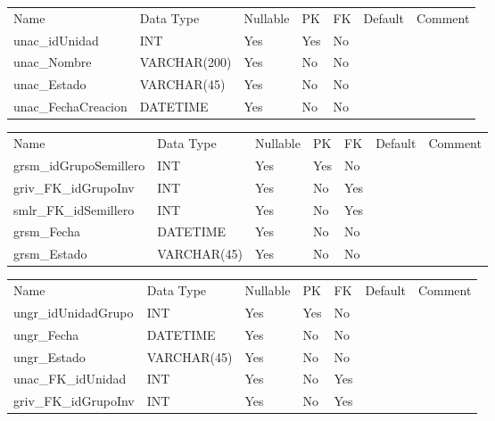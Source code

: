 			\begin{center}
				\begin{tabular}{ |l|l|l|l|l|l|l| }
					\hline
					Name & Data Type & Nullable & PK & FK & Default & Comment \\
					unac_idUnidad & INT & Yes & Yes & No &  & \\ \hline 
unac_Nombre & VARCHAR(200) & Yes & No & No &  & \\ \hline 
unac_Estado & VARCHAR(45) & Yes & No & No &  & \\ \hline 
unac_FechaCreacion & DATETIME & Yes & No & No &  & \\ \hline 

				\end{tabular}
			\end{center}
		

			\begin{center}
				\begin{tabular}{ |l|l|l|l|l|l|l| }
					\hline
					Name & Data Type & Nullable & PK & FK & Default & Comment \\
					grsm_idGrupoSemillero & INT & Yes & Yes & No &  & \\ \hline 
griv_FK_idGrupoInv & INT & Yes & No & Yes &  & \\ \hline 
smlr_FK_idSemillero & INT & Yes & No & Yes &  & \\ \hline 
grsm_Fecha & DATETIME & Yes & No & No &  & \\ \hline 
grsm_Estado & VARCHAR(45) & Yes & No & No &  & \\ \hline 

				\end{tabular}
			\end{center}
		

			\begin{center}
				\begin{tabular}{ |l|l|l|l|l|l|l| }
					\hline
					Name & Data Type & Nullable & PK & FK & Default & Comment \\
					ungr_idUnidadGrupo & INT & Yes & Yes & No &  & \\ \hline 
ungr_Fecha & DATETIME & Yes & No & No &  & \\ \hline 
ungr_Estado & VARCHAR(45) & Yes & No & No &  & \\ \hline 
unac_FK_idUnidad & INT & Yes & No & Yes &  & \\ \hline 
griv_FK_idGrupoInv & INT & Yes & No & Yes &  & \\ \hline 

				\end{tabular}
			\end{center}
		

